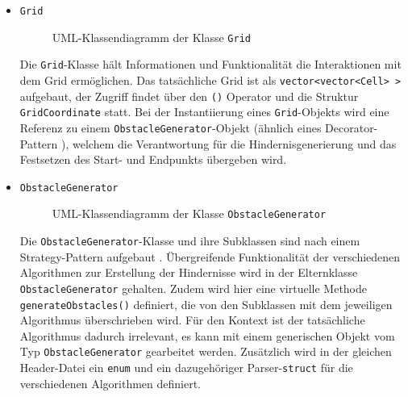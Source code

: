 \begin{itemize}
    \item \texttt{Grid} \\
    \begin{figure}[H]
        \vspace{-0.5cm}
        \centering
        
        \caption{UML-Klassendiagramm der Klasse \texttt{Grid}}
        \label{fig:uml_grid}
    \end{figure}
    Die \texttt{Grid}-Klasse hält Informationen und Funktionalität die Interaktionen mit dem Grid ermöglichen.
    Das tatsächliche Grid ist als \texttt{vector<vector<Cell> >} aufgebaut, der Zugriff findet über den \texttt{()}
    Operator und die Struktur \texttt{GridCoordinate} statt.
    Bei der Instantiierung eines \texttt{Grid}-Objekts wird eine Referenz zu einem \texttt{ObstacleGenerator}-Objekt (ähnlich eines Decorator-Pattern \cite{nesteruk2021}),
    welchem die Verantwortung für die Hindernisgenerierung und das Festsetzen des Start- und Endpunkts übergeben wird.
    \newpage
    \item \texttt{ObstacleGenerator} \\
    \begin{figure}[H]
        \vspace{-0.5cm}
        \centering
        
        \caption{UML-Klassendiagramm der Klasse \texttt{ObstacleGenerator}}
        \label{fig:uml_obstacle_gen}
    \end{figure}
    Die \texttt{ObstacleGenerator}-Klasse und ihre Subklassen sind nach einem Strategy-Pattern aufgebaut \cite{nesteruk2021}.
    Übergreifende Funktionalität der verschiedenen Algorithmen zur Erstellung der Hindernisse wird in der Elternklasse \texttt{Obstacle\-Generator} gehalten.
    Zudem wird hier eine virtuelle Methode \texttt{generate\-Obstacles()} definiert, die von den Subklassen mit dem jeweiligen Algorithmus überschrieben wird.
    Für den Kontext ist der tatsächliche Algorithmus dadurch irrelevant, es kann mit einem generischen Objekt vom Typ \texttt{ObstacleGenerator} gearbeitet werden.
    Zusätzlich wird in der gleichen Header-Datei ein \texttt{enum} und ein dazugehöriger Parser-\texttt{struct} für die verschiedenen Algorithmen definiert.
\end{itemize}
